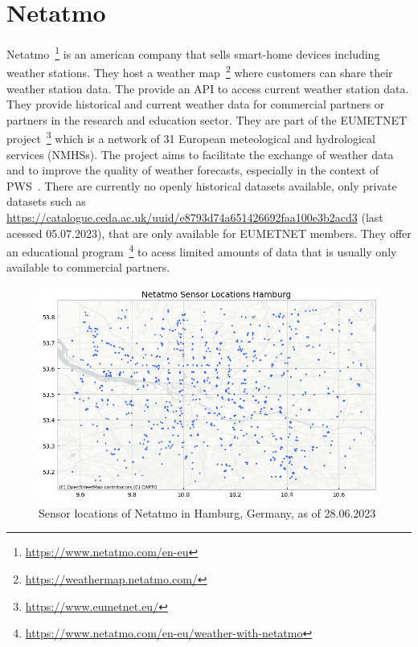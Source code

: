 \section{Netatmo}

Netatmo~\footnote{\url{https://www.netatmo.com/en-eu}} is an american company that sells smart-home devices including weather stations. They host a weather map~\footnote{\url{https://weathermap.netatmo.com/}} where customers can share their weather station data. The provide an API to access current weather station data. They provide historical and current weather data for commercial partners or partners in the research and education sector. They are part of the EUMETNET project~\footnote{\url{https://www.eumetnet.eu/}} which is a network of 31 European meteological and hydrological services (NMHSs). The project aims to facilitate the exchange of weather data and to improve the quality of weather forecasts, especially in the context of PWS~\cite{hahn2022observations}. There are currently no openly historical datasets available, only private datasets such as \url{https://catalogue.ceda.ac.uk/uuid/e8793d74a651426692faa100e3b2acd3} (last acessed 05.07.2023), that are only available for EUMETNET members. They offer an educational program~\footnote{\url{https://www.netatmo.com/en-eu/weather-with-netatmo}} to acess limited amounts of data that is usually only available to commercial partners.

\begin{figure}[ht]
    \centering
    \includegraphics[width=1\textwidth]{images/netatmo_sensor_locations_germany.png}
    \caption{Sensor locations of Netatmo in Hamburg, Germany, as of 28.06.2023}
    \label{fig:netatmo sensor locations germany}
\end{figure}

